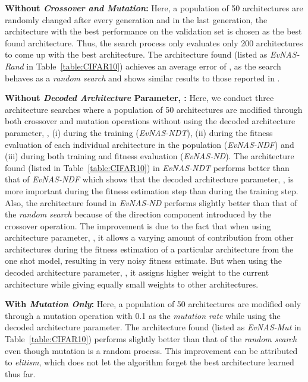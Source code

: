 \documentclass[final]{cvpr}
\begin{document}
\textbf{Without \textit{Crossover and Mutation}:} Here, a population of 50 architectures are
randomly changed after every generation and in the last generation, the architecture with the best
performance on the validation set is chosen as the best found architecture. Thus, the search
process only evaluates only 200 architectures to come up with the best architecture. The
architecture found (listed as \textit{EvNAS-Rand} in Table~\ref{table:CIFAR10}) achieves an average
error of , as the search behaves as a \textit{random search} and shows similar results
to those reported in \cite{li2019random}.

\textbf{Without \textit{Decoded Architecture} Parameter, :} Here, we conduct three
architecture searches where a population of 50 architectures are modified through both crossover
and mutation operations without using the decoded architecture parameter, , (i)
during the training (\textit{EvNAS-NDT}), (ii) during the fitness evaluation of each individual
architecture in the population (\textit{EvNAS-NDF}) and (iii) during both training and fitness
evaluation (\textit{EvNAS-ND}). The architecture found (listed in Table~\ref{table:CIFAR10})
in \textit{EvNAS-NDT} performs better than that of \textit{EvNAS-NDF} which shows that the decoded
architecture parameter, , is more important during the fitness estimation step
than during the training step. Also, the architecture found in \textit{EvNAS-ND} performs slightly
better than that of the \textit{random search} because of the direction component introduced by the
crossover operation. The improvement is due to the fact that when using architecture
parameter, , it allows a varying amount of contribution from other architectures during the
fitness estimation of a particular architecture from the one shot model, resulting in very noisy
fitness estimate. But when using the decoded architecture parameter, , it assigns
higher weight to the current architecture while giving equally small weights to other architectures.

\textbf{With \textit{Mutation Only}:} Here, a population of 50 architectures are modified only
through a mutation operation with 0.1 as the \textit{mutation rate} while using the decoded
architecture parameter. The architecture found (listed as
\textit{EvNAS-Mut} in Table~\ref{table:CIFAR10}) performs slightly better than that of the
\textit{random search} even though mutation is a random process. This improvement can be attributed
to \textit{elitism}, which does not let the algorithm forget the best architecture learned thus far. 
\end{document}
